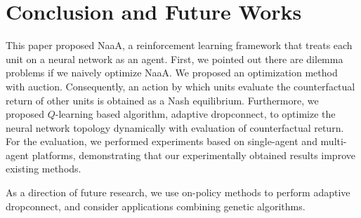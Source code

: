 \section{Conclusion and Future Works}
This paper proposed NaaA, a reinforcement learning framework that treats each unit on a neural network as an agent.
First, we pointed out there are dilemma problems if we naively optimize NaaA. We
proposed an optimization method with auction.
Consequently, an action by which units evaluate the counterfactual return of other units is obtained as a Nash equilibrium.
Furthermore, we proposed $Q$-learning based algorithm, adaptive dropconnect, to optimize the neural network topology dynamically with evaluation of counterfactual return.
For the evaluation, we performed experiments based on single-agent and multi-agent platforms, demonstrating that our experimentally obtained results improve existing methods.

As a direction of future research, we use on-policy methods to perform adaptive dropconnect, and
consider applications combining genetic algorithms.
